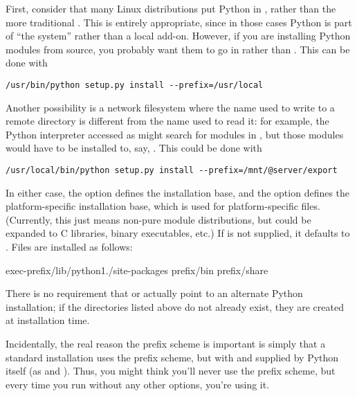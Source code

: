 \documentclass{howto}
\begin{document}
First, consider that many Linux distributions put Python in ,
rather than the more traditional .  This is entirely
appropriate, since in those cases Python is part of ``the system''
rather than a local add-on.  However, if you are installing Python
modules from source, you probably want them to go in
 rather than
.  This can be done with
\begin{verbatim}
/usr/bin/python setup.py install --prefix=/usr/local
\end{verbatim}

Another possibility is a network filesystem where the name used to write
to a remote directory is different from the name used to read it: for
example, the Python interpreter accessed as 
might search for modules in ,
but those modules would have to be installed to, say,
.  This
could be done with
\begin{verbatim}
/usr/local/bin/python setup.py install --prefix=/mnt/@server/export
\end{verbatim}

In either case, the  option defines the
installation base, and the  option defines
the platform-specific installation base, which is used for
platform-specific files.  (Currently, this just means non-pure module
distributions, but could be expanded to C libraries, binary executables,
etc.)  If  is not supplied, it defaults to
.  Files are installed as follows:

              {exec-prefix}{/lib/python1./site-packages}
              {prefix}{/bin}
              {prefix}{/share}

There is no requirement that  or
 actually point to an alternate Python
installation; if the directories listed above do not already exist, they
are created at installation time.

Incidentally, the real reason the prefix scheme is important is simply
that a standard \UNIX{} installation uses the prefix scheme, but with
 and  supplied by
Python itself (as  and ).  Thus,
you might think you'll never use the prefix scheme, but every time you
run  without any other options, you're
using it.
\end{document}
